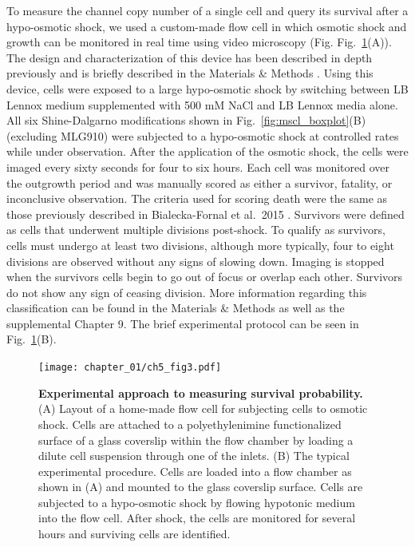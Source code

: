 \documentclass[12pt]{caltech_thesis}
\begin{document}
To measure the channel copy number of a single cell and query its
survival after a hypo-osmotic shock, we used a custom-made flow cell in
which osmotic shock and growth can be monitored in real time using video
microscopy (Fig. Fig.~\ref{fig:flow_cell}(A)). The design and
characterization of this device has been described in depth previously
and is briefly described in the Materials \& Methods
\autocite{bialecka-fornal2015}. Using this device, cells were exposed to
a large hypo-osmotic shock by switching between LB Lennox medium
supplemented with 500 mM NaCl and LB Lennox media alone. All six
Shine-Dalgarno modifications shown in Fig.~\ref{fig:mscl_boxplot}(B)
(excluding MLG910) were subjected to a hypo-osmotic shock at controlled
rates while under observation. After the application of the osmotic
shock, the cells were imaged every sixty seconds for four to six hours.
Each cell was monitored over the outgrowth period and was manually
scored as either a survivor, fatality, or inconclusive observation. The
criteria used for scoring death were the same as those previously
described in Bialecka-Fornal et al.~2015 \autocite{bialecka-fornal2015}.
Survivors were defined as cells that underwent multiple divisions
post-shock. To qualify as survivors, cells must undergo at least two
divisions, although more typically, four to eight divisions are observed
without any signs of slowing down. Imaging is stopped when the survivors
cells begin to go out of focus or overlap each other. Survivors do not
show any sign of ceasing division. More information regarding this
classification can be found in the Materials \& Methods as well as the
supplemental Chapter 9. The brief experimental protocol can be seen in
Fig.~\ref{fig:flow_cell}(B).

\hypertarget{fig:flow_cell}{%
\begin{figure}
\centering
\texttt{[image: chapter\_01/ch5\_fig3.pdf]}
\caption[{Experimental approach to measuring survival
probability}]{\textbf{Experimental approach to measuring survival
probability.} (A) Layout of a home-made flow cell for subjecting cells
to osmotic shock. Cells are attached to a polyethylenimine
functionalized surface of a glass coverslip within the flow chamber by
loading a dilute cell suspension through one of the inlets. (B) The
typical experimental procedure. Cells are loaded into a flow chamber as
shown in (A) and mounted to the glass coverslip surface. Cells are
subjected to a hypo-osmotic shock by flowing hypotonic medium into the
flow cell. After shock, the cells are monitored for several hours and
surviving cells are identified.}
\label{fig:flow_cell}
\end{figure}
}
\end{document}
